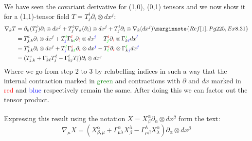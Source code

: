 \documentclass[10pt]{article}
\begin{document}
We have seen the covariant derivative for (1,0), (0,1) tensors and we now show it for a (1,1)-tensor field $T=T_j^i\partial_i\otimes dx^j$:
$$
\begin{aligned}
	\nabla_k T &= \partial_k(T_j^i)\partial_i\otimes dx^j + T_j^i\nabla_k(\partial_i)\otimes dx^j+ T_j^i\partial_i\otimes \nabla_k(dx^j)\marginnote{Ref [1], Pg 225, Ex 8.31}\\
	&= T_{j,k}^i\partial_i\otimes dx^j + T_{\textcolor{blue}j}^{\textcolor{green}i}\Gamma_{k{\textcolor{green}i}}^{\textcolor{red}\ell}\partial_{\textcolor{red}\ell}\otimes dx^{\textcolor{blue}j}- T_{\textcolor{green}j}^{\textcolor{red}i}\partial_{\textcolor{red}i}\otimes \Gamma_{k{\textcolor{blue}\ell}}^{\textcolor{green}j}dx^{\textcolor{blue}\ell}\\
	&= T_{j,k}^i\partial_i\otimes dx^j + T_{\textcolor{blue}j}^{\textcolor{green}\ell}\Gamma_{k{\textcolor{green}\ell}}^{\textcolor{red}i}\partial_{\textcolor{red}i}\otimes dx^{\textcolor{blue}j}- T_{\textcolor{green}\ell}^{\textcolor{red}i}\partial_{\textcolor{red}i}\otimes \Gamma_{k{\textcolor{blue}j}}^{\textcolor{green}\ell}dx^{\textcolor{blue}j}\\
	&= (T_{j,k}^i + \Gamma_{k{\ell}}^{i}T_{j}^{\ell} - \Gamma_{k{j}}^{\ell}T_{\ell}^{i})\partial_i\otimes dx^j
\end{aligned}
$$
Where we go from step 2 to 3 by relabelling indices in such a way that the internal contraction marked in \textcolor{green}{green} and contractions with $\partial$ and $dx$ marked in \textcolor{red}{red} and \textcolor{blue}{blue} respectively remain the same. After doing this we can factor out the tensor product.\\\\
Expressing this result using the notation $X=X_\beta^\alpha\partial_\alpha\otimes dx^\beta$ form the text:
$$
	\nabla_\mu X = (X_{\beta,\mu}^\alpha+\Gamma_{\mu\lambda}^\alpha X_\beta^\lambda-\Gamma_{\mu\beta}^\lambda X_\lambda^\alpha)\partial_\alpha\otimes dx^\beta
$$
\end{document}
